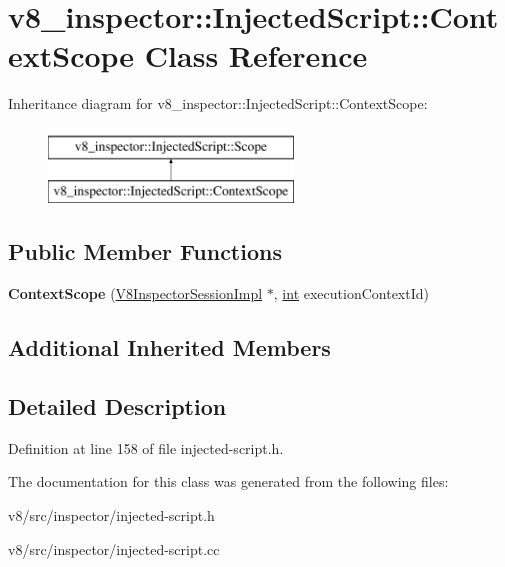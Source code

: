 \hypertarget{classv8__inspector_1_1InjectedScript_1_1ContextScope}{}\section{v8\+\_\+inspector\+:\+:Injected\+Script\+:\+:Context\+Scope Class Reference}
\label{classv8__inspector_1_1InjectedScript_1_1ContextScope}
Inheritance diagram for v8\+\_\+inspector\+:\+:Injected\+Script\+:\+:Context\+Scope\+:\begin{figure}[H]
\begin{center}
\leavevmode
\includegraphics[height=2.000000cm]{classv8__inspector_1_1InjectedScript_1_1ContextScope}
\end{center}
\end{figure}
\subsection*{Public Member Functions}
\begin{DoxyCompactItemize}
\item 
\mbox{\label{classv8__inspector_1_1InjectedScript_1_1ContextScope_ae1190e0aecd8f2b8514a145111b962e4}} 
{\bfseries Context\+Scope} (\mbox{\hyperlink{classv8__inspector_1_1V8InspectorSessionImpl}{V8\+Inspector\+Session\+Impl}} $\ast$, \mbox{\hyperlink{classint}{int}} execution\+Context\+Id)
\end{DoxyCompactItemize}
\subsection*{Additional Inherited Members}


\subsection{Detailed Description}


Definition at line 158 of file injected-\/script.\+h.



The documentation for this class was generated from the following files\+:\begin{DoxyCompactItemize}
\item 
v8/src/inspector/injected-\/script.\+h\item 
v8/src/inspector/injected-\/script.\+cc\end{DoxyCompactItemize}
